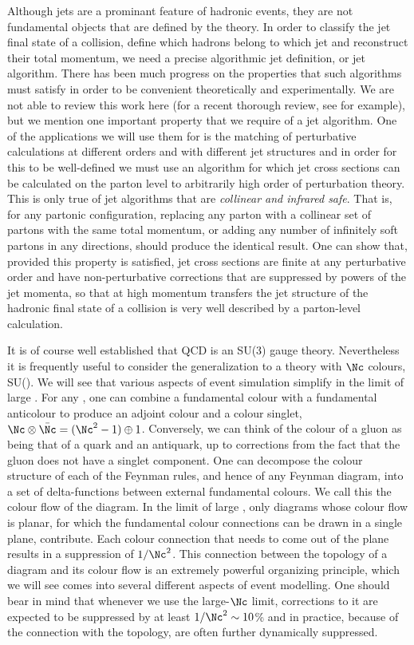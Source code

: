 Although jets are a prominant feature of hadronic events, they are not
fundamental objects that are defined by the theory.  In order to
classify the jet final state of a collision, define which hadrons belong
to which jet and reconstruct their total momentum, we need a precise
algorithmic jet definition, or jet algorithm.  There has been much
progress on the properties that such algorithms must satisfy in order to
be convenient theoretically and experimentally.  We are not able to
review this work here (for a recent thorough review, see
\cite{Salam:2009jx} for example), but we mention one important property
that we require of a jet algorithm.  One of the applications we will use
them for is the matching of perturbative calculations at different
orders and with different jet structures and in order for this to be
well-defined we must use an algorithm for which jet cross sections can
be calculated on the parton level to arbitrarily high order of
perturbation theory.  This is only true of jet algorithms that are
\emph{collinear and infrared safe}.  That is, for
any partonic configuration, replacing any parton with a collinear set of
partons with the same total momentum, or adding any number of infinitely
soft partons in any directions, should produce the identical
result.  One can show that, provided this property is satisfied, jet
cross sections are finite at any perturbative order and have
non-perturbative corrections that are suppressed by powers of the jet
momenta, so that at high momentum transfers the jet structure of the
hadronic final state of
a collision is very well described by a parton-level calculation.

\label{sec:large-nc-limit}

It is of course well established that QCD is an SU(3) gauge theory.
Nevertheless it is frequently useful to consider the generalization to
a theory with $\Nc$ colours, SU(\Nc). 
  We will see that various aspects of event simulation
simplify in the limit of large \Nc.  For any \Nc, one can combine a
fundamental colour with a fundamental anticolour to produce an adjoint
colour and a colour singlet, $\Nc\otimes\bar{\Nc}=(\Nc^2-1)\oplus1$.
Conversely, we can think of the colour of a gluon as being that of a
quark and an antiquark, up to corrections from the fact that the gluon
does not have a singlet component.  One can decompose the colour
structure of each of the Feynman rules, and hence of any Feynman diagram,
into a set of delta-functions between external fundamental colours.  We
call this the colour flow of the diagram.  In the limit of large \Nc,
only diagrams whose colour flow is planar, \ie for which the fundamental
colour connections can be drawn in a single plane, contribute.  Each
colour connection that needs to come out of the plane results in a
suppression of $1/\Nc^2$.  This connection between the topology of a
diagram and its colour flow is an extremely powerful organizing
principle, which we will see comes into several different aspects of
event modelling.  One should bear in mind that whenever we use the
large-$\Nc$ limit, corrections to it are expected to be suppressed by at
least $1/\Nc^2\sim10$\% and in practice, because of the connection with
the topology, are often further dynamically suppressed.

